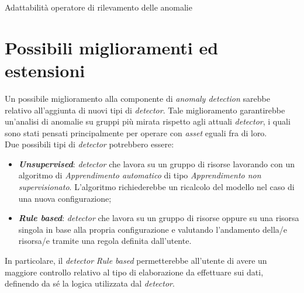 \begin{risk}{Adattabilità operatore di rilevamento delle anomalie}
    \label{risk:anomalyDetector} 
\end{risk}

\section{Possibili miglioramenti ed estensioni}
Un possibile miglioramento alla componente di \textit{anomaly detection} sarebbe relativo all'aggiunta di nuovi tipi di \textit{detector}. Tale miglioramento garantirebbe un'analisi di anomalie su gruppi più mirata rispetto agli attuali \textit{detector}, i quali sono stati pensati principalmente per operare con \textit{asset} eguali fra di loro.\\
Due possibili tipi di \textit{detector} potrebbero essere:
\begin{itemize}
	\item{\textbf{\textit{Unsupervised}}: \textit{detector} che lavora su un gruppo di risorse lavorando con un algoritmo di \textit{\gls{Apprendimento automatico}} di tipo \textit{\gls{Apprendimento non supervisionato}}. L'algoritmo richiederebbe un ricalcolo del modello nel caso di una nuova configurazione;}
	\item{\textbf{\textit{Rule based}}: \textit{detector} che lavora su un gruppo di risorse oppure su una risorsa singola in base alla propria configurazione e valutando l'andamento della/e risorsa/e tramite una regola definita dall'utente.}
\end{itemize}
In particolare, il \textit{detector} \textit{Rule based} permetterebbe all'utente di avere un maggiore controllo relativo al tipo di elaborazione da effettuare sui dati, definendo da sé la logica utilizzata dal \textit{detector}.




